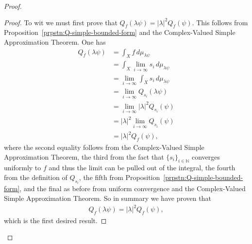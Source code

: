 \begin{proof}
\begin{proof}
To wit we must first prove that $Q_f(\lambda\psi) = \lvert\lambda\rvert^2 Q_f(\psi)$. This follows from Proposition~\ref{prpstn:Q-simple-bounded-form} and the Complex-Valued Simple Approximation Theorem. One has
\begin{align}
    Q_f(\lambda\psi) &= \int_X f \, d\mu_{\lambda\psi} \\
                     &= \int_X \lim\limits_{i \rightarrow \infty} s_i \, d\mu_{\lambda\psi} \\
                     &= \lim\limits_{i \rightarrow \infty} \int_X s_i \, d\mu_{\lambda\psi} \\
                     &= \lim\limits_{i \rightarrow \infty} Q_{s_i}(\lambda\psi) \\
                     &= \lim\limits_{i \rightarrow \infty} \left\lvert\lambda\right\rvert^2 Q_{s_i}(\psi) \\
                     &= \left\lvert\lambda\right\rvert^2 \lim\limits_{i \rightarrow \infty} Q_{s_i}(\psi) \\
                     &= \left\lvert\lambda\right\rvert^2 Q_f(\psi),
\end{align}
where the second equality follows from the Complex-Valued Simple Approximation Theorem, the third from the fact that $\{s_i\}_{i \in \mathbb{N}}$ converges uniformly to $f$ and thus the limit can be pulled out of the integral, the fourth from the definition of $Q_{s_i}$, the fifth from Proposition~\ref{prpstn:Q-simple-bounded-form}, and the final as before from uniform convergence and the Complex-Valued Simple Approximation Theorem. So in summary we have proven that
\begin{align}
    Q_f(\lambda\psi) = \left\lvert\lambda\right\rvert^2 Q_f(\psi),
\end{align}
which is the first desired result.


\end{proof}
\end{proof}
